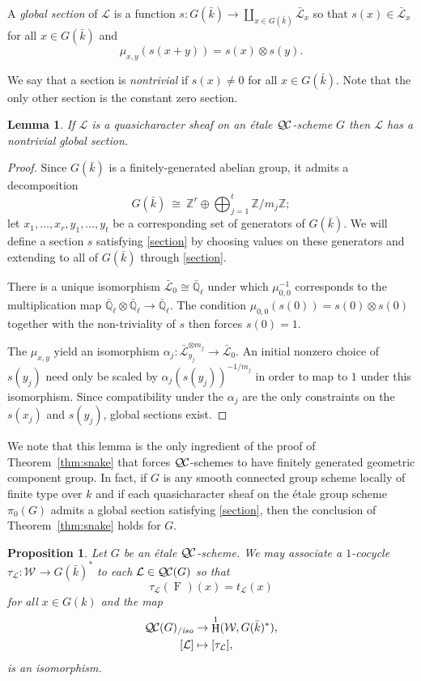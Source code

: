 \documentclass[11pt]{amsart}
\theoremstyle{plain}
\newtheorem{proposition}[theorem]{Proposition}
\newtheorem{lemma}[theorem]{Lemma}
\theoremstyle{definition}
\theoremstyle{remark}
\newcommand{\ZZ}{{\mathbb{Z}}}
\newcommand{\EE}{\mathbb{\bar Q}_\ell}
\newcommand{\bFq}{\bar{k}}
\newcommand{\Fq}{k}
\newcommand{\Frob}[1]{\operatorname{F}_{#1}}
\DeclareMathOperator{\Hh}{H}
\newcommand{\iso}{{\ \cong\ }}
\newcommand{\qcs}[1]{{\mathcal{#1}}}
\newcommand{\gqcs}[1]{{\mathcal{\bar #1}}}
\newcommand{\QC}{{\mathcal{Q\hskip-0.8pt C}}}
\newcommand{\QCiso}[1]{\QC(#1)_{/\textit{iso}}}
\newcommand{\Weil}[1]{\mathcal{W}_{#1}}
\newcommand{\trFrob}[1]{t_{#1}}
\begin{document}
A \emph{global section} of $\qcs{L}$ is a function $s : G(\bFq) \to \coprod_{x \in G(\bFq)} \gqcs{L}_x$ so that $s(x) \in \gqcs{L}_x$ for all $x \in G(\bFq)$ and
\begin{equation}\label{section}
\mu_{x,y}(s(x+y)) = s(x) \otimes s(y).
\end{equation}

We say that a section is \emph{nontrivial} if $s(x) \ne 0$ for all $x \in G(\bFq)$.  Note that the only other section is the constant zero section.

\begin{lemma}\label{lemma:section}
 If $\qcs{L}$ is a quasicharacter sheaf on an \'etale $\QC$-scheme $G$ then $\qcs{L}$ has a nontrivial global section.
\end{lemma}

\begin{proof}
  Since $G(\bFq)$ is a finitely-generated abelian group, it admits a decomposition
  \[
  G(\bFq) \iso \ZZ^r \oplus \bigoplus_{j=1}^t \ZZ / m_j \ZZ;
  \]
  let $x_1, \ldots, x_r, y_1, \ldots, y_t$ be a corresponding set of generators of $G(\bFq)$.
  We will define a section $s$ satisfying \eqref{section} by choosing values on these generators and extending to all
  of $G(\bFq)$ through \eqref{section}.
  
  There is a unique isomorphism $\gqcs{L}_0 \cong \EE$ under which $\mu_{0,0}^{-1}$ corresponds
  to the multiplication map $\EE \otimes\EE \to \EE$.
  The condition $\mu_{0,0}(s(0)) = s(0) \otimes s(0)$ together with the non-triviality of $s$
  then forces $s(0) = 1$.
  
  The $\mu_{x,y}$ yield an isomorphism $\alpha_j : \gqcs{L}_{y_j}^{\otimes m_j} \to \gqcs{L}_0$.
  An initial nonzero choice of $s(y_j)$ need only be scaled by $\alpha_j(s(y_j))^{-1/m_j}$ in order to map to
  $1$ under this isomorphism.  Since compatibility under the $\alpha_j$ are the only constraints on the
  $s(x_j)$ and $s(y_j)$, global sections exist.
\end{proof}

We note that this lemma is the only ingredient of the proof of Theorem~\ref{thm:snake}
that forces $\QC$-schemes to have finitely generated geometric component group.  In fact,
if $G$ is any smooth connected group scheme locally of finite type over $\Fq$
and if each quasicharacter sheaf on the \'etale group scheme $\pi_0(G)$ admits a global section 
satisfying \eqref{section}, then the conclusion of Theorem~\ref{thm:snake} holds for $G$.

\begin{proposition}\label{prop:etale}
  Let $G$ be an \'etale $\QC$-scheme.
  We may associate a $1$-cocycle $\tau_\qcs{L}: \Weil{}\to G(\bFq)^*$ to each $\qcs{L} \in \QC(G)$
  so that
  \[
  \tau_\qcs{L}(\Frob{})(x) = \trFrob{\qcs{L}}(x)
  \]
  for all $x \in G(\Fq)$ and the map
  \begin{align*}
  \QCiso{G} &\to \Hh^1(\Weil{}, G(\bFq)^*), \\
  [\qcs{L}] &\mapsto [\tau_\qcs{L}],
  \end{align*}
  is an isomorphism.
\end{proposition}
\end{document}
